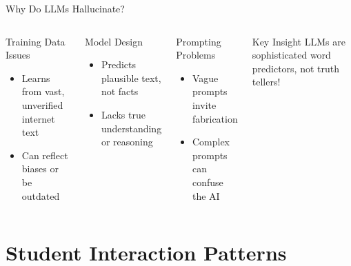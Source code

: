 \documentclass{beamer}
\begin{document}
\begin{frame}{Why Do LLMs Hallucinate?}
\begin{columns}
\begin{block}{Training Data Issues}
\begin{itemize}
\item Learns from vast, unverified internet text
\item Can reflect biases or be outdated
\end{itemize}
\end{block}
\pause
\begin{block}{Model Design}
\begin{itemize}
\item Predicts plausible text, not facts
\item Lacks true understanding or reasoning
\end{itemize}
\end{block}
\pause
\begin{block}{Prompting Problems}
\begin{itemize}
\item Vague prompts invite fabrication
\item Complex prompts can confuse the AI
\end{itemize}
\end{block}
\pause
\begin{alertblock}{Key Insight}
LLMs are sophisticated word predictors, not truth tellers!
\end{alertblock}
\end{columns}
\end{frame}

\section{Student Interaction Patterns}
\end{document}
